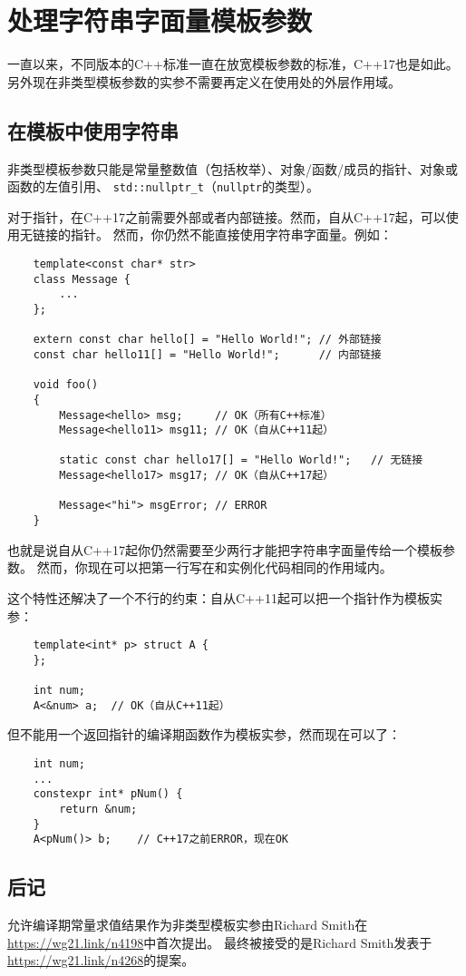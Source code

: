 \chapter{处理字符串字面量模板参数}\label{ch12}
一直以来，不同版本的C++标准一直在放宽模板参数的标准，C++17也是如此。
另外现在非类型模板参数的实参不需要再定义在使用处的外层作用域。

\section{在模板中使用字符串}
非类型模板参数只能是常量整数值（包括枚举）、对象/函数/成员的指针、对象或函数的左值引用、
\texttt{std::nullptr\_t}（\texttt{nullptr}的类型）。

对于指针，在C++17之前需要外部或者内部链接。然而，自从C++17起，可以使用无链接的指针。
然而，你仍然不能直接使用字符串字面量。例如：
\begin{lstlisting}
    template<const char* str>
    class Message {
        ...
    };

    extern const char hello[] = "Hello World!"; // 外部链接
    const char hello11[] = "Hello World!";      // 内部链接

    void foo()
    {
        Message<hello> msg;     // OK（所有C++标准）
        Message<hello11> msg11; // OK（自从C++11起）

        static const char hello17[] = "Hello World!";   // 无链接
        Message<hello17> msg17; // OK（自从C++17起）

        Message<"hi"> msgError; // ERROR
    }
\end{lstlisting}
也就是说自从C++17起你仍然需要至少两行才能把字符串字面量传给一个模板参数。
然而，你现在可以把第一行写在和实例化代码相同的作用域内。

这个特性还解决了一个不行的约束：自从C++11起可以把一个指针作为模板实参：
\begin{lstlisting}
    template<int* p> struct A {
    };
    
    int num;
    A<&num> a;  // OK（自从C++11起）
\end{lstlisting}
但不能用一个返回指针的编译期函数作为模板实参，然而现在可以了：
\begin{lstlisting}
    int num;
    ...
    constexpr int* pNum() {
        return &num;
    }
    A<pNum()> b;    // C++17之前ERROR，现在OK
\end{lstlisting}

\section{后记}
允许编译期常量求值结果作为非类型模板实参由Richard Smith在\url{https://wg21.link/n4198}中首次提出。
最终被接受的是Richard Smith发表于\url{https://wg21.link/n4268}的提案。